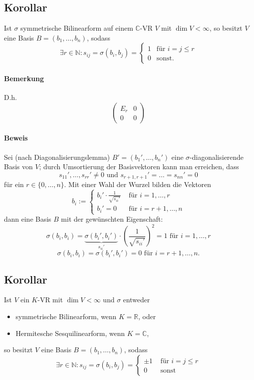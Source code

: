 \subsection{Korollar}
	Ist $ \sigma $ symmetrische Bilinearform auf einem $ \mathbb{C} $-VR $ V $ mit $ \dim V < \infty $, so besitzt $ V $ eine Basis $ B = (b_1,\dots,b_n) $, sodass
		\[ \exists r\in \mathbb{N}: s_{ij} = \sigma(b_i,b_j) = \begin{cases}
		1 & \text{für } i = j \leq r\\
		0 & \text{sonst}.
		\end{cases} \]
		
\paragraph{Bemerkung}
	D.h.
		\[ \begin{pmatrix}
		E_r & 0 \\ 0 & 0
		\end{pmatrix} \]
\paragraph{Beweis}
	Sei (nach Diagonalisierungslemma) $ B' = (b_1',\dots,b_n') $ eine $ \sigma$-diagonalisierende Basis von $ V $; durch Umsortierung der Basisvektoren kann man erreichen, dass
		\[ s_{11}' ,\dots, s_{rr}' \neq 0 \text{ und } s_{r+1,r+1}' = \dots = s_{nn}' = 0 \]
	für ein $ r\in \{0,\dots,n\} $. Mit einer Wahl der Wurzel bilden die Vektoren 
		\[ b_i := \begin{cases}
		{b_i'}\cdot \frac{1}{\sqrt{s_{ii}'}} & \text{ für } i = 1,\dots,r\\
		b_i' = 0 & \text{ für } i = r+1,\dots,n 
		\end{cases} \]
	dann eine Basis $ B $ mit der gewünschten Eigenschaft:
		\[ \sigma(b_i,b_i) = \underset{s_{ii}'}{\underbrace{\sigma(b_i',b_i')}} \cdot \left(\frac{1}{\sqrt{s_{ii}'}}\right)^2 = 1 \text{ für } i = 1,\dots,r\]
		\[ \sigma(b_i,b_i) = \sigma(b_i',b_i') = 0 \text{ für } i = r+1,\dots, n. \]
		
\subsection{Korollar}
	Ist $ V $ ein $ K $-VR mit $ \dim V <\infty $ und $ \sigma $ entweder
		\begin{itemize}
			\item symmetrische Bilinearform, wenn $ K=\mathbb{R} $, oder
			\item Hermitesche Sesquilinearform, wenn $ K = \mathbb{C} $,
		\end{itemize}
	so besitzt $ V $ eine Basis $ B = (b_1,\dots,b_n) $, sodass
		\[ \exists r\in \mathbb{N}: s_{ij} = \sigma(b_i,b_j) =
		\begin{cases}
			\pm 1 & \text{ für }i = j \leq r\\
			0 & \text{ sonst}
		\end{cases} \]
